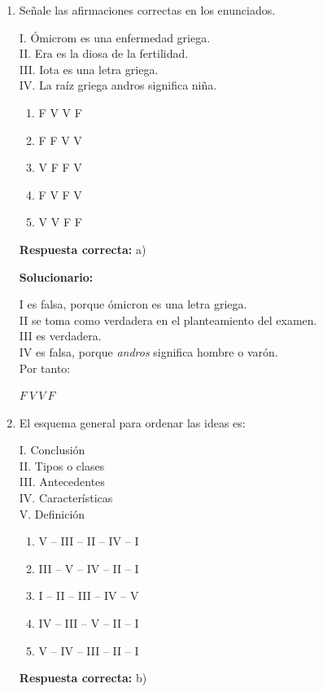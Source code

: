 \begin{enumerate}[resume]
	\vspace{2mm}
	\textbf{Solucionario:}
	
	“Afección” es el término más general, porque puede incluir diversas enfermedades, trastornos o alteraciones.
	
	\vspace{6mm}
	
	\item Señale las afirmaciones correctas en los enunciados.
	
	I. Ómicrom es una enfermedad griega.\\
	II. Era es la diosa de la fertilidad.\\
	III. Iota es una letra griega.\\
	IV. La raíz griega andros significa niña.
	
	\begin{enumerate}[label=\alph*)]
		\item F V V F
		\item F F V V
		\item V F F V
		\item F V F V
		\item V V F F
	\end{enumerate}
	\textbf{Respuesta correcta:} a)
	
	\vspace{2mm}
	\textbf{Solucionario:}
	
	I es falsa, porque ómicron es una letra griega.\\
	II se toma como verdadera en el planteamiento del examen.\\
	III es verdadera.\\
	IV es falsa, porque \textit{andros} significa hombre o varón.\\
	Por tanto:
	
	$F\ V\ V\ F$
	
	\vspace{6mm}
	
	\item El esquema general para ordenar las ideas es:
	
	I. Conclusión\\
	II. Tipos o clases\\
	III. Antecedentes\\
	IV. Características\\
	V. Definición
	
	\begin{enumerate}[label=\alph*)]
		\item V -- III -- II -- IV -- I
		\item III -- V -- IV -- II -- I
		\item I -- II -- III -- IV -- V
		\item IV -- III -- V -- II -- I
		\item V -- IV -- III -- II -- I
	\end{enumerate}
	\textbf{Respuesta correcta:} b)
	

\end{enumerate}
